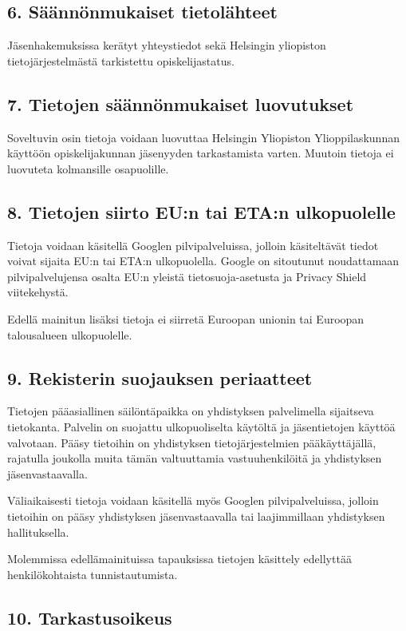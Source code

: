 \documentclass[finnish]{tktltiki}
\begin{document}
\subsection*{6. Säännönmukaiset tietolähteet}
Jäsenhakemuksissa kerätyt yhteystiedot sekä Helsingin yliopiston tietojärjestelmästä tarkistettu opiskelijastatus.

\subsection*{7. Tietojen säännönmukaiset luovutukset}

Soveltuvin osin tietoja voidaan luovuttaa Helsingin Yliopiston Ylioppilaskunnan käyttöön opiskelijakunnan jäsenyyden tarkastamista varten. Muutoin tietoja ei luovuteta kolmansille osapuolille.
\subsection*{8. Tietojen siirto EU:n tai ETA:n ulkopuolelle}

Tietoja voidaan käsitellä Googlen pilvipalveluissa, jolloin käsiteltävät tiedot voivat sijaita EU:n tai ETA:n ulkopuolella. Google on sitoutunut noudattamaan pilvipalvelujensa osalta EU:n yleistä tietosuoja-asetusta ja Privacy Shield viitekehystä.

Edellä mainitun lisäksi tietoja ei siirretä Euroopan unionin tai Euroopan talousalueen ulkopuolelle.

\subsection*{9. Rekisterin suojauksen periaatteet}

Tietojen pääasiallinen säilöntäpaikka on yhdistyksen palvelimella sijaitseva tietokanta. Palvelin on suojattu ulkopuoliselta käytöltä ja jäsentietojen käyttöä valvotaan. Pääsy tietoihin on yhdistyksen tietojärjestelmien pääkäyttäjällä, rajatulla joukolla muita tämän valtuuttamia vastuuhenkilöitä ja yhdistyksen jäsenvastaavalla.

Väliaikaisesti tietoja voidaan käsitellä myös Googlen pilvipalveluissa, jolloin tietoihin on pääsy yhdistyksen jäsenvastaavalla tai laajimmillaan yhdistyksen hallituksella.

Molemmissa edellämainituissa tapauksissa tietojen käsittely edellyttää henkilökohtaista tunnistautumista.

\subsection*{10. Tarkastusoikeus}
\end{document}
